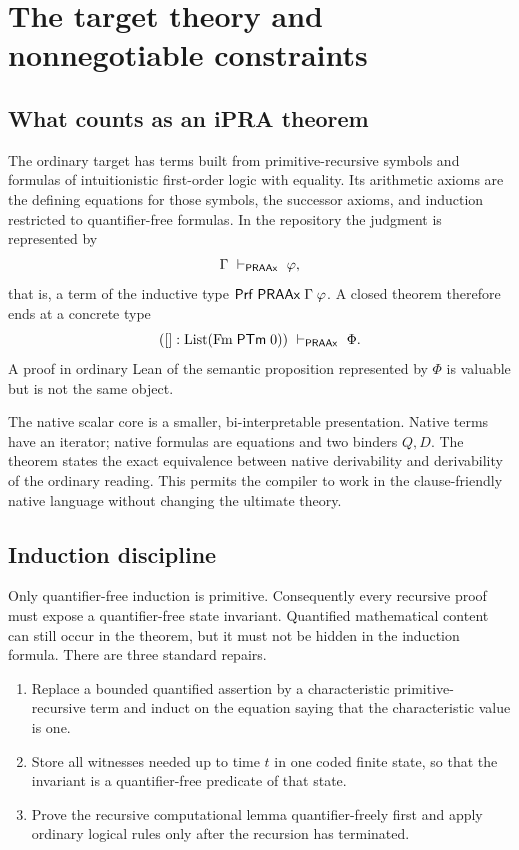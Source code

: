 \section{The target theory and nonnegotiable constraints}

\subsection{What counts as an iPRA theorem}

The ordinary target has terms built from primitive-recursive symbols and
formulas of intuitionistic first-order logic with equality.  Its arithmetic
axioms are the defining equations for those symbols, the successor axioms, and
induction restricted to quantifier-free formulas.  In the repository the
judgment is represented by
\[
       \Gamma\ \vdash_{\mathsf{PRAAx}}\ \varphi,
\]
that is, a term of the inductive type \(\mathsf{Prf}\;\mathsf{PRAAx}\;\Gamma\;\varphi\).
A closed theorem therefore ends at a concrete type
\[
       ([]:\mathrm{List}(\mathrm{Fm}\;\mathsf{PTm}\;0))
           \ \vdash_{\mathsf{PRAAx}}\ \Phi.
\]
A proof in ordinary Lean of the semantic proposition represented by \(\Phi\)
is valuable but is not the same object.

The native scalar core is a smaller, bi-interpretable presentation.  Native
terms have an iterator; native formulas are equations and two binders \(Q,D\).
The theorem  states the exact equivalence between native
derivability and derivability of the ordinary reading.  This permits the
compiler to work in the clause-friendly native language without changing the
ultimate theory.

\subsection{Induction discipline}

Only quantifier-free induction is primitive.  Consequently every recursive
proof must expose a quantifier-free state invariant.  Quantified mathematical
content can still occur in the theorem, but it must not be hidden in the
induction formula.  There are three standard repairs.

\begin{enumerate}
\item Replace a bounded quantified assertion by a characteristic primitive-
recursive term and induct on the equation saying that the characteristic value
is one.
\item Store all witnesses needed up to time \(t\) in one coded finite state, so
that the invariant is a quantifier-free predicate of that state.
\item Prove the recursive computational lemma quantifier-freely first and apply
ordinary logical rules only after the recursion has terminated.
\end{enumerate}

